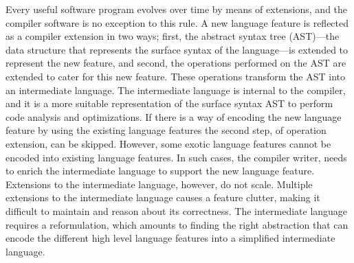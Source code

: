 \documentclass[screen,nonacm]{acmart}
\begin{document}
Every useful software program evolves over time by means of
extensions, and the compiler software is no exception to
this rule. A new language feature is reflected as
a compiler extension in two ways; first,
the abstract syntax tree (AST)---the data structure that represents
the surface syntax of the language---is extended to represent the new
feature, and second, the operations performed on the AST are extended
to cater for this new feature. These operations transform the AST into
an intermediate language. The intermediate language is internal to the
compiler\cite{siek_compilation_2023}, and it is a more suitable
representation of the surface syntax AST to perform code analysis and
optimizations\cite{aho_compilers_1986}.
If there is a way of encoding the new language feature by using the
existing language features the second step, of operation extension, can be
skipped. However, some exotic language features cannot be encoded
into existing language features. In such cases, the compiler writer, needs
to enrich the intermediate language to support the
new language feature. Extensions to the intermediate language,
however, do not scale. Multiple extensions to the intermediate
language causes a feature clutter, making it difficult to
maintain and reason about its correctness. The intermediate language
requires a reformulation, which amounts to finding the right
abstraction that can encode the different high level language features
into a simplified intermediate language.
\end{document}
